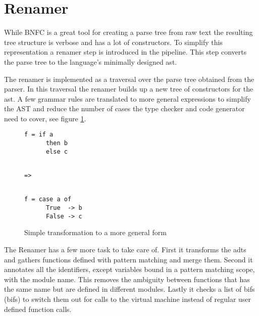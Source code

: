 \section{Renamer}


While BNFC is a great tool for creating a parse tree from raw text the resulting tree structure is verbose and has a lot of constructors. To simplify this representation a renamer step is introduced in the pipeline. This step converts the parse tree to the language's minimally designed \acrshort{ast}. 

The renamer is implemented as a traversal over the parse tree obtained from the parser. In this traversal the renamer builds up a new tree of constructors for the \acrshort{ast}. A few grammar rules are translated to more general expressions to simplify the AST and reduce the number of cases the type checker and code generator need to cover, see figure \ref{lst:renamer1}.

\begin{figure}[ht]
\centering
{}%
\begin{minipage}[b]{0.30\linewidth}
    \centering
    \begin{lstlisting}
f = if a
      then b
      else c
    \end{lstlisting}
\end{minipage}
\begin{minipage}[b]{0.09\linewidth}
    \centering
    \begin{lstlisting}
    
=>
 
    \end{lstlisting}
\end{minipage}
\begin{minipage}[b]{0.30\linewidth}
    \centering
    \begin{lstlisting}
f = case a of
      True  -> b
      False -> c
    \end{lstlisting}
\end{minipage}
\caption{Simple transformation to a more general form}
\label{lst:renamer1}
\end{figure}

The Renamer has a few more task to take care of. First it transforms the \acrshort{adt}s and gathers functions defined with pattern matching and merge them. Second it annotates all the identifiers, except variables bound in a pattern matching scope, with the module name. This removes the ambiguity between functions that has the same name but are defined in different modules. Lastly it checks a list of \acrlong{bif}s (\acrshort{bif}s) to switch them out for calls to the virtual machine instead of regular user defined function calls.

